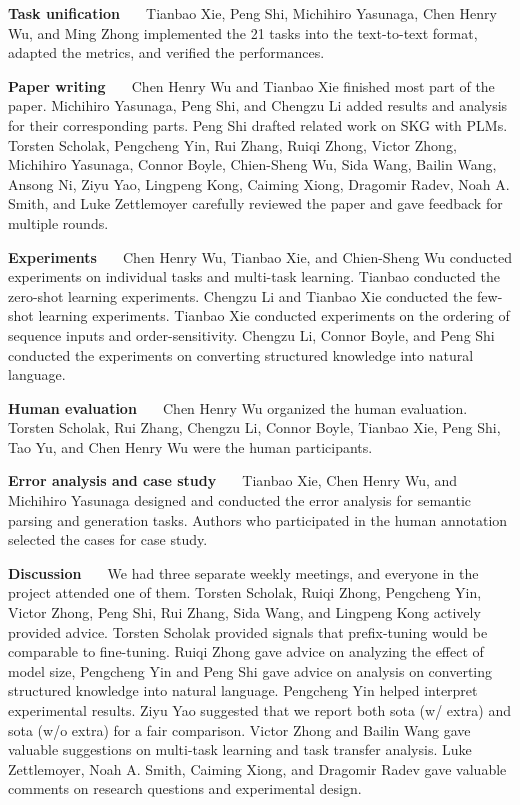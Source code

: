 \documentclass[11pt]{article}
\newcommand{\ntasks}{21\xspace}
\begin{document}
\noindent\textbf{Task unification \ \ } Tianbao Xie, Peng Shi, Michihiro Yasunaga, Chen Henry Wu, and Ming Zhong implemented the \ntasks tasks into the text-to-text format, adapted the metrics, and verified the performances. 

\noindent\textbf{Paper writing \ \ } Chen Henry Wu and Tianbao Xie finished most part of the paper. 
Michihiro Yasunaga, Peng Shi, and Chengzu Li added results and analysis for their corresponding parts. 
Peng Shi drafted related work on SKG with PLMs. 
Torsten Scholak, Pengcheng Yin, Rui Zhang, Ruiqi Zhong, Victor Zhong, Michihiro Yasunaga, Connor Boyle, Chien-Sheng Wu, Sida Wang, Bailin Wang, Ansong Ni, Ziyu Yao, Lingpeng Kong, Caiming Xiong, Dragomir Radev, Noah A. Smith, and Luke Zettlemoyer carefully reviewed the paper and gave feedback for multiple rounds. 

\noindent\textbf{Experiments \ \ } Chen Henry Wu, Tianbao Xie, and Chien-Sheng Wu conducted experiments on individual tasks and multi-task learning. Tianbao conducted the zero-shot learning experiments. Chengzu Li and Tianbao Xie conducted the few-shot learning experiments. Tianbao Xie conducted experiments on the ordering of sequence inputs and order-sensitivity. 
Chengzu Li, Connor Boyle, and Peng Shi conducted the experiments on converting structured knowledge into natural language. 

\noindent\textbf{Human evaluation \ \ } Chen Henry Wu organized the human evaluation. Torsten Scholak, Rui Zhang, Chengzu Li, Connor Boyle, Tianbao Xie, Peng Shi, Tao Yu, and Chen Henry Wu were the human participants. 

\noindent\textbf{Error analysis and case study \ \ } Tianbao Xie, Chen Henry Wu, and Michihiro Yasunaga designed and conducted the error analysis for semantic parsing and generation tasks. Authors who participated in the human annotation selected the cases for case study. 

\noindent\textbf{Discussion \ \ } 
We had three separate weekly meetings, and everyone in the project attended one of them. 
Torsten Scholak, Ruiqi Zhong, Pengcheng Yin, Victor Zhong, Peng Shi, Rui Zhang, Sida Wang, and Lingpeng Kong actively provided advice.
Torsten Scholak provided signals that prefix-tuning would be comparable to fine-tuning.
Ruiqi Zhong gave advice on analyzing the effect of model size,
Pengcheng Yin and Peng Shi gave advice on analysis on converting structured knowledge into natural language.
Pengcheng Yin helped interpret experimental results.
Ziyu Yao suggested that we report both sota (w/ extra) and sota (w/o extra) for a fair comparison. 
Victor Zhong and Bailin Wang gave valuable suggestions on multi-task learning and task transfer analysis. 
Luke Zettlemoyer, Noah A. Smith, Caiming Xiong, and Dragomir Radev gave valuable comments on research questions and experimental design.
\end{document}
